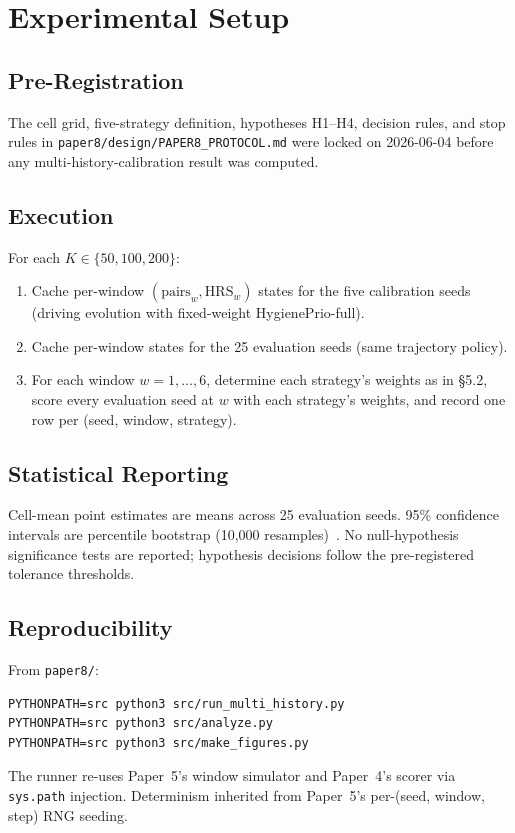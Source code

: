 \section{Experimental Setup}

\subsection{Pre-Registration}

The cell grid, five-strategy definition, hypotheses H1--H4, decision
rules, and stop rules in \texttt{paper8/design/PAPER8\_PROTOCOL.md}
were locked on 2026-06-04 before any multi-history-calibration result
was computed.

\subsection{Execution}

For each $K \in \{50, 100, 200\}$:
\begin{enumerate}
\item Cache per-window $(\text{pairs}_w, \text{HRS}_w)$ states for the
five calibration seeds (driving evolution with fixed-weight HygienePrio-full).
\item Cache per-window states for the 25 evaluation seeds (same trajectory policy).
\item For each window $w = 1, \ldots, 6$, determine each strategy's
weights as in \S5.2, score every evaluation seed at $w$ with each
strategy's weights, and record one row per (seed, window, strategy).
\end{enumerate}

\subsection{Statistical Reporting}

Cell-mean point estimates are means across 25 evaluation seeds. 95\%
confidence intervals are percentile bootstrap (10{,}000 resamples)~\cite{efron1994introduction}.
No null-hypothesis significance tests are reported; hypothesis decisions
follow the pre-registered tolerance thresholds.

\subsection{Reproducibility}

From \texttt{paper8/}:
{\small\begin{verbatim}
PYTHONPATH=src python3 src/run_multi_history.py
PYTHONPATH=src python3 src/analyze.py
PYTHONPATH=src python3 src/make_figures.py
\end{verbatim}}
The runner re-uses Paper~5's window simulator and Paper~4's scorer
via \texttt{sys.path} injection. Determinism inherited from Paper~5's
per-(seed, window, step) RNG seeding.
